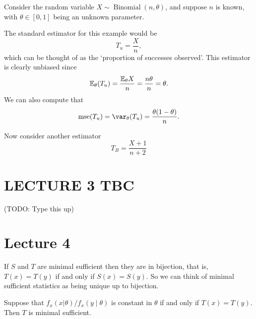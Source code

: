 \documentclass[a4paper]{scrartcl}
\begin{document}
\begin{example}
  Consider the random variable $X \sim \operatorname{Binomial}(n, \theta)$, and suppose $n$ is known, with $\theta \in [0, 1]$ being an unknown parameter. 

  The standard estimator for this example would be
  $$
  T_u = \frac{X}{n},
  $$
  which can be thought of as the `proportion of successes observed'.
  This estimator is clearly unbiased since
  $$
  \mathbb{E}_\theta(T_u) = \frac{\mathbb{E}_\theta{X}}{n} = \frac{n \theta}{n} = \theta.
  $$
  We can also compute that
  $$
  \operatorname{mse}(T_u) = \var_\theta(T_u) = \frac{\theta(1 - \theta)}{n}.
  $$

  Now consider another estimator
  $$
  T_B = \frac{X + 1}{n + 2} 
  $$
\end{example}


\section{LECTURE 3 TBC}

(TODO: Type this up)

\section{Lecture 4}

\begin{remark}
  If $S$ and $T$ are minimal sufficient then they are in bijection, that is, $T(x) = T(y)$ if and only if $S(x) = S(y)$. 
  So we can think of minimal sufficient statistics as being unique up to bijection.
\end{remark}

\begin{theorem}
  Suppose that $f_x(x | \theta ) / f_x(y \mid \theta)$ is constant in $\theta$ if and only if $T(x) = T(y)$. Then $T$ is minimal sufficient.
\end{theorem}
\end{document}
